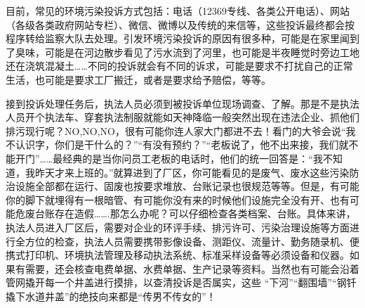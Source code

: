 \documentclass[
]{book}
\begin{document}
目前，常见的环境污染投诉方式包括：电话（12369专线、各类公开电话）、网站（各级各类政府网站专栏）、微信、微博以及传统的来信等，这些投诉最终都会按程序转给监察大队去处理。引发环境污染投诉的原因有很多种，可能是在家里闻到了臭味，可能是在河边散步看见了污水流到了河里，也可能是半夜睡觉时旁边工地还在浇筑混凝土\ldots\ldots 不同的投诉就会有不同的诉求，可能是要求不打扰自己的正常生活，也可能是要求工厂搬迁，或者是要求给予赔偿，等等。

接到投诉处理任务后，执法人员必须到被投诉单位现场调查、了解。那是不是执法人员开个执法车、穿套执法制服就能如天神降临一般突然出现在违法企业、抓他们排污现行呢？NO,NO,NO，很有可能你连人家大门都进不去！看门的大爷会说``我不认识字，你们是干什么的？''``有没有预约？''``老板说了，他不出来接，我们就不能开门''\ldots\ldots 最经典的是当你问员工老板的电话时，他们的统一回答是：``我不知道，我昨天才来上班的。''就算进到了厂区，你可能看见的是废气、废水这些污染防治设施全部都在运行、固废也按要求堆放、台账记录也很规范等等。但是，有可能你的脚下就埋得有一根暗管、有可能你没有来的时候他们设施完全没有开、也有可能危废台账存在造假\ldots\ldots.那怎么办呢？可以仔细检查各类档案、台账。具体来讲，执法人员进入厂区后，需要对企业的环评手续、排污许可、污染治理设施等方面进行全方位的检查，执法人员需要携带影像设备、测距仪、流量计、勤务随录机、便携式打印机、环境执法管理及移动执法系统、标准采样设备等必须设备和仪器。如果有需要，还会核查电费单据、水费单据、生产记录等资料。当然也有可能会沿着管网撬开每一个井盖进行摸排，以查清投诉是否属实，这些 ``下河''``翻围墙''``钢钎撬下水道井盖''的绝技向来都是``传男不传女的''！
\end{document}
